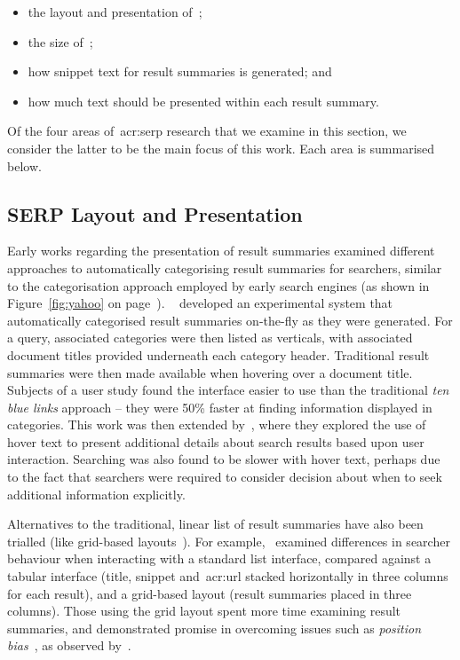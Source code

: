\begin{itemize}
    \item{the layout and presentation of~;}
    \item{the size of~;}
    \item{how snippet text for result summaries is generated; and}
    \item{how much text should be presented within each result summary}.
\end{itemize}

Of the four areas of~\gls{acr:serp} research that we examine in this section, we consider the latter to be the main focus of this work. Each area is summarised below.

\subsection{SERP Layout and Presentation}
Early works regarding the presentation of result summaries examined different approaches to automatically categorising result summaries for searchers, similar to the categorisation approach employed by early search engines (as shown in Figure~\ref{fig:yahoo} on page~\pageref{fig:yahoo}). ~\cite{chen2000order_to_web} developed an experimental system that automatically categorised result summaries on-the-fly as they were generated. For a query, associated categories were then listed as verticals, with associated document titles provided underneath each category header. Traditional result summaries were then made available when hovering over a document title. Subjects of a user study found the interface easier to use than the traditional \emph{ten blue links} approach -- they were 50\% faster at finding information displayed in categories. This work was then extended by~\cite{dumais2001results_in_context}, where they explored the use of hover text to present additional details about search results based upon user interaction. Searching was also found to be slower with hover text, perhaps due to the fact that searchers were required to consider decision about when to seek additional information explicitly.

Alternatives to the traditional, linear list of result summaries have also been trialled (like grid-based layouts~\citep{resnick2001modeling, kammerer2010interface, chierichetti2011two_dimensional_presentation}). For example,~\cite{kammerer2010interface} examined differences in searcher behaviour when interacting with a standard list interface, compared against a tabular interface (title, snippet and~\gls{acr:url} stacked horizontally in three columns for each result), and a grid-based layout (result summaries placed in three columns). Those using the grid layout spent more time examining result summaries, and demonstrated promise in overcoming issues such as \emph{position bias}~\citep{craswell2008click_models}, as observed by~\cite{joachims2005click_model}.

